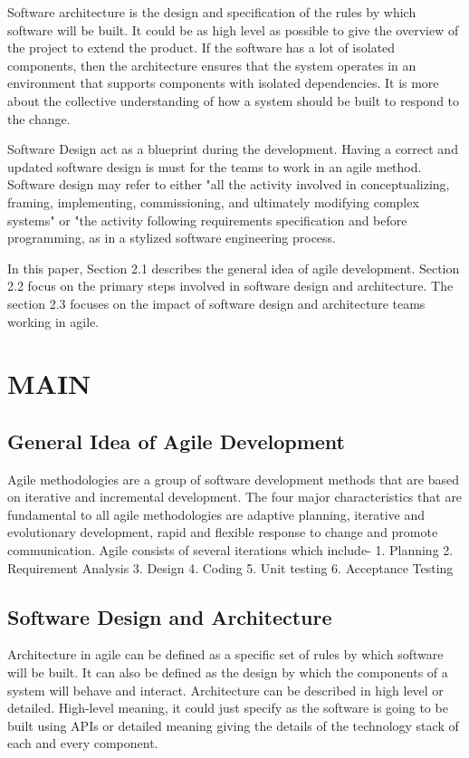 \documentclass[sigplan,screen]{acmart}
\begin{document}
Software architecture is the design and specification of the rules by which software will be built. It could be as high level as possible to give the overview of the project to extend the product. If the software has a lot of isolated components, then the architecture ensures that the system operates in an environment that supports components with isolated dependencies. It is more about the collective understanding of how a system should be built to respond to the change.

Software Design act as a blueprint during the development. Having a correct and updated software design is must for the teams to work in an agile method. Software design may refer to either "all the activity involved in conceptualizing, framing, implementing, commissioning, and ultimately modifying complex systems" or "the activity following requirements specification and before programming, as in a stylized software engineering process.\cite{freeman01}

In this paper, Section 2.1 describes the general idea of agile development. Section 2.2 focus on the primary steps involved in software design and architecture. The section 2.3 focuses on the impact of software design and architecture teams working in agile.


\section{MAIN}
\subsection{General Idea of Agile Development}
Agile methodologies are a group of software development methods that are based on iterative and incremental development. The four major characteristics that are fundamental to all agile methodologies are adaptive planning, iterative and evolutionary development, rapid and flexible response to change and promote communication. Agile consists of several iterations which include- 1. Planning 2. Requirement Analysis 3. Design 4. Coding 5. Unit testing 6. Acceptance Testing\cite{Architecture05}


\subsection{Software Design and Architecture}
Architecture in agile can be defined as a specific set of rules by which software will be built. It can also be defined as the design by which the components of a system will behave and interact. Architecture can be described in high level or detailed. High-level meaning, it could just specify as the software is going to be built using APIs or detailed meaning giving the details of the technology stack of each and every component.
\end{document}

